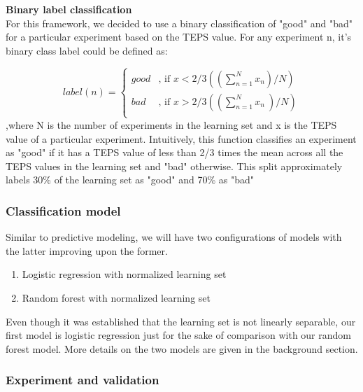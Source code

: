 \textbf{Binary label classification}\\
For this framework, we decided to use a binary classification of "good" and "bad" for a particular experiment based on the TEPS value. For any experiment n, it's binary class label could be defined as:


\[
  label(n) =
  \begin{cases}
                                   good & \text{, if $x < 2/3((\sum_{n=1}^{N} x_{n} )/N)$} \\
                                   bad & \text{, if $x > 2/3((\sum_{n=1}^{N} x_{n} \ )/N)$} \\
  \end{cases}
\]
 ,where N is the number of experiments in the learning set and x is the TEPS value of a particular experiment. Intuitively, this function classifies an experiment as "good" if it has a TEPS value of less than 2/3 times the mean across all the TEPS values in the learning set and "bad" otherwise. This split approximately labels 30\% of the learning set as "good" and 70\% as "bad"
   
\subsubsection{Classification model}
Similar to predictive modeling, we will have two configurations of models with the latter improving upon the former. 


\begin{enumerate}
    \item Logistic regression with normalized learning set
    \item Random forest with normalized learning set
\end{enumerate}
Even though it was established that the learning set is not linearly separable, our first model is logistic regression just for the sake of comparison with our random forest model. More details on the two models are given in the background section.\\

\subsubsection{Experiment and validation}

